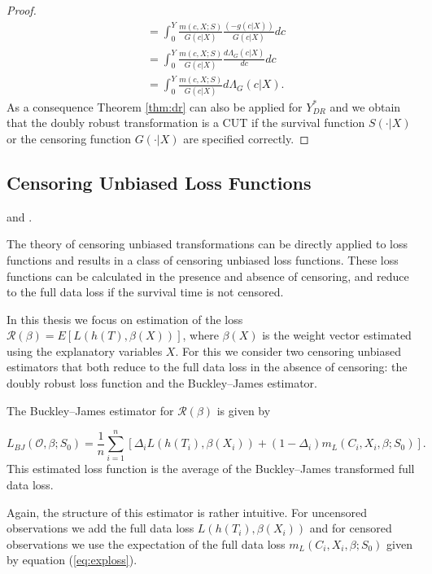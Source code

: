 \documentclass[12pt, a4paper]{scrartcl}
\theoremstyle{definition}
\theoremstyle{plain}
\numberwithin{equation}{section}
\numberwithin{figure}{section}
\numberwithin{table}{section}
\begin{document}
\begin{proof}
\begin{equation*}
\begin{split}
		& = \int_{0}^{Y}\frac{m(c,X;S)}{G(c\vert X)}\frac{(-g(c\vert X))}{G(c\vert X)}dc\\
		&= \int_{0}^{Y}\frac{m(c,X;S)}{G(c\vert X)}\frac{d\Lambda_G(c \vert X)}{dc}dc\\
		&= \int_{0}^{Y}\frac{m(c,X;S)}{G(c\vert X)}d\Lambda_G(c \vert X).
		\end{split}
		\end{equation*}
		As a consequence Theorem \ref{thm:dr} can also be applied for $Y_{DR}^*$ and we obtain that the doubly robust transformation is a CUT if the survival function $S(\cdot\vert X)$ or the censoring function $G(\cdot\vert X)$ are specified correctly.
	\end{proof}

	\subsection{Censoring Unbiased Loss Functions}\label{sec:cudls}
	\citet*{culs} and \citet*{basearticle}.
	
	The theory of censoring unbiased transformations can be directly applied to loss functions and results in a class of censoring unbiased loss functions. 
	These loss functions can be calculated in the presence and absence of censoring, and reduce to the full data loss if the survival time is not censored.
	
	In this thesis we focus on estimation of the loss $\mathcal{R} (\beta) = E[L(h(T),\beta(X))]$, where $\beta(X)$ is the weight vector estimated using the explanatory variables $X$.
	For this we consider two censoring unbiased estimators that both reduce to the full data loss in the absence of censoring: the doubly robust loss function and the Buckley--James estimator.
	
	
	The Buckley--James estimator for $\mathcal{R}(\beta)$ is given by
	
	\begin{equation}\label{eq:bj}
	L_{BJ}(\mathcal{O}, \beta; S_0) = \frac{1}{n} \sum_{i=1}^n \left[ \Delta_i L(h(T_i), \beta(X_i))+(1-\Delta_i)m_L(C_i, X_i, \beta; S_0)\right].
	\end{equation}
	This estimated loss function is the average of the Buckley--James transformed full data loss.
	
	Again, the structure of this estimator is rather intuitive.
	For uncensored observations we add the full data loss $L(h(T_i), \beta(X_i))$ and for censored observations we use the expectation of the full data loss $m_L(C_i, X_i, \beta; S_0)$ given by equation (\ref{eq:exploss}).
	
\end{document}
